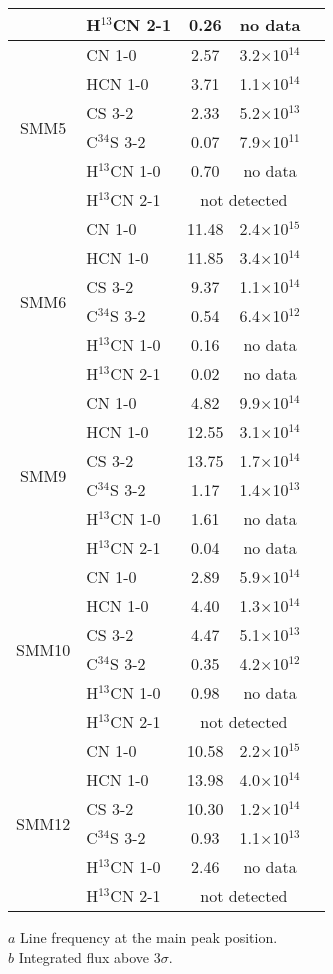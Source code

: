 \documentclass{aa}
\begin{document}
\begin{table*}
\begin{tabular}{c l c c c}
{} & H$^{13}$CN 2-1 & 0.26 & no data\\  \hline
\multirow{6}{*}{SMM5} & CN 1-0 & 2.57 & 3.2$\times$10$^{14}$\\
{} & HCN 1-0 & 3.71 & 1.1$\times$10$^{14}$\\ 
{} & CS 3-2 & 2.33 & 5.2$\times$10$^{13}$\\  
{} & C$^{34}$S 3-2 & 0.07 & 7.9$\times$10$^{11}$\\ 
{} & H$^{13}$CN 1-0 & 0.70 & no data\\ 
{} & H$^{13}$CN 2-1 & \multicolumn{2}{c}{not detected}  \\  \hline
\multirow{6}{*}{SMM6} & CN 1-0 & 11.48 & 2.4$\times$10$^{15}$\\
{} & HCN 1-0 & 11.85 & 3.4$\times$10$^{14}$ \\ 
{} & CS 3-2 & 9.37 & 1.1$\times$10$^{14}$ \\  
{} & C$^{34}$S 3-2 & 0.54 & 6.4$\times$10$^{12}$ \\ 
{} & H$^{13}$CN 1-0 & 0.16 & no data\\
{} & H$^{13}$CN 2-1 & 0.02 & no data \\  \hline
\multirow{6}{*}{SMM9} & CN 1-0 & 4.82 & 9.9$\times$10$^{14}$\\
{} & HCN 1-0 & 12.55 & 3.1$\times$10$^{14}$ \\ 
{} & CS 3-2 & 13.75 & 1.7$\times$10$^{14}$\\ 
{} & C$^{34}$S 3-2 & 1.17 & 1.4$\times$10$^{13}$ \\ 
{} & H$^{13}$CN 1-0 & 1.61 & no data\\ 
{} & H$^{13}$CN 2-1 & 0.04 & no data\\  \hline
\multirow{6}{*}{SMM10} & CN 1-0 & 2.89 & 5.9$\times$10$^{14}$\\
{} & HCN 1-0 & 4.40 & 1.3$\times$10$^{14}$\\ 
{} & CS 3-2 & 4.47 & 5.1$\times$10$^{13}$ \\  
{} & C$^{34}$S 3-2 & 0.35 & 4.2$\times$10$^{12}$\\ 
{} & H$^{13}$CN 1-0 & 0.98 & no data\\ 
{} & H$^{13}$CN 2-1 & \multicolumn{2}{c}{not detected}  \\  \hline
\multirow{6}{*}{SMM12} & CN 1-0 & 10.58 & 2.2$\times$10$^{15}$\\
{} & HCN 1-0 & 13.98 & 4.0$\times$10$^{14}$\\ 
{} & CS 3-2 & 10.30 & 1.2$\times$10$^{14}$\\  
{} & C$^{34}$S 3-2 & 0.93 & 1.1$\times$10$^{13}$\\ 
{} & H$^{13}$CN 1-0 & 2.46 & no data\\ 
{} & H$^{13}$CN 2-1 & \multicolumn{2}{c}{not detected}  \\  \hline
\end{tabular}
\begin{flushleft}
$a$ Line frequency at the main peak position. \\
$b$ Integrated flux above 3$\sigma$.\\
\end{flushleft}
\end{table*}
\end{document}
